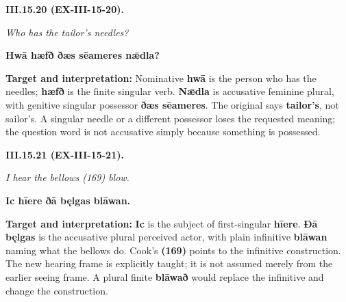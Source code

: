 \par\begin{minipage}{\linewidth}\raggedright
\textbf{III.15.20 (EX-III-15-20).}

\emph{Who has the tailor’s needles?}

\textbf{Hwā hæfð ðæs sēameres nǣdla?}

\textbf{Target and interpretation:} Nominative \textbf{hwā} is the person who has the needles; \textbf{hæfð} is the finite singular verb. \textbf{Nǣdla} is accusative feminine plural, with genitive singular possessor \textbf{ðæs sēameres}. The original says \textbf{tailor's}, not sailor's. A singular needle or a different possessor loses the requested meaning; the question word is not accusative simply because something is possessed.

\end{minipage}\par\addvspace{4pt}

\par\begin{minipage}{\linewidth}\raggedright
\textbf{III.15.21 (EX-III-15-21).}

\emph{I hear the bellows (169) blow.}

\textbf{Ic hīere ðā bęlgas blāwan.}

\textbf{Target and interpretation:} \textbf{Ic} is the subject of first-singular \textbf{hīere}. \textbf{Ðā bęlgas} is the accusative plural perceived actor, with plain infinitive \textbf{blāwan} naming what the bellows do. Cook's \textbf{(169)} points to the infinitive construction. The new hearing frame is explicitly taught; it is not assumed merely from the earlier seeing frame. A plural finite \textbf{blāwað} would replace the infinitive and change the construction.

\end{minipage}\par\addvspace{4pt}

